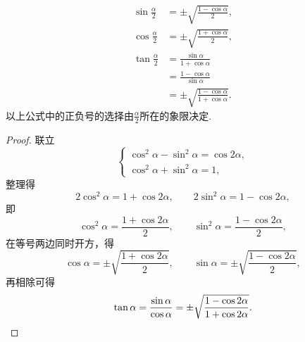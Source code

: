 \begin{proposition}[半倍角公式]
\begin{align}
	\sin\frac\alpha2 &= \pm \sqrt{\frac{1 - \cos\alpha}{2}},
		\label{equation:三角函数.正弦的半倍角公式} \\
	\cos\frac\alpha2 &= \pm \sqrt{\frac{1 + \cos\alpha}{2}}, \\
	\tan\frac\alpha2
	&= \frac{\sin\alpha}{1+\cos\alpha} \\
	&= \frac{1-\cos\alpha}{\sin\alpha} \\
	&= \pm \sqrt{\frac{1 - \cos\alpha}{1 + \cos\alpha}}.
\end{align}
以上公式中的正负号的选择由\(\frac\alpha2\)所在的象限决定.
\begin{proof}
联立\begin{equation*}
	\left\{ \begin{array}{l}
		\cos^2\alpha - \sin^2\alpha = \cos 2\alpha, \\
		\cos^2\alpha + \sin^2\alpha = 1,
	\end{array} \right.
\end{equation*}
整理得\begin{equation*}
	2\cos^2\alpha=1+\cos2\alpha, \qquad
	2\sin^2\alpha=1-\cos2\alpha,
\end{equation*}
即\begin{equation*}
	\cos^2\alpha=\frac{1+\cos2\alpha}{2}, \qquad
	\sin^2\alpha=\frac{1-\cos2\alpha}{2},
\end{equation*}
在等号两边同时开方，得\begin{equation*}
	\cos\alpha = \pm\sqrt{\frac{1+\cos2\alpha}{2}}, \qquad
	\sin\alpha = \pm\sqrt{\frac{1-\cos2\alpha}{2}},
\end{equation*}
再相除可得\begin{equation*}
	\tan\alpha = \frac{\sin\alpha}{\cos\alpha}
	= \pm \sqrt{\frac{1 - \cos2\alpha}{1 + \cos2\alpha}}.
	\qedhere
\end{equation*}
\end{proof}
\end{proposition}

